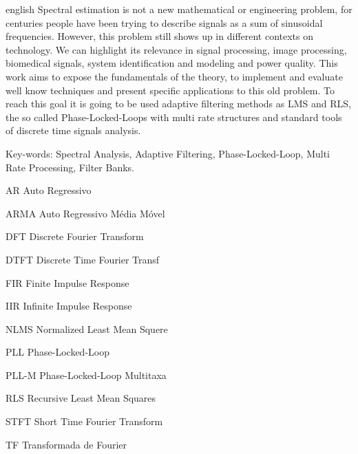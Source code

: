 \documentclass[
12pt,
openany, %
oneside, %
a4paper,			
english,			
brazil			        %
]{abntbibufjf}
\begin{document}
\begin{resumo}[ABSTRACT]
	\begin{otherlanguage*}{english}
		Spectral estimation is not a new mathematical or engineering problem, for centuries people have been trying to describe signals as a sum of sinusoidal frequencies.  However, this problem still shows up in different contexts on technology. We can highlight its relevance in signal processing, image processing, biomedical signals, system identification and modeling and power quality. This work aims to expose the fundamentals of the theory, to implement and evaluate well know techniques and present specific applications to this old problem. To reach this goal it is going to be used adaptive filtering methods as LMS and RLS, the so called Phase-Locked-Loops with multi rate structures and standard tools of discrete time signals analysis.  
		
		Key-words: Spectral Analysis, Adaptive Filtering, Phase-Locked-Loop, Multi Rate Processing, Filter Banks.
		
	\end{otherlanguage*}
\end{resumo}


\listoffigures*
\cleardoublepage


\listoftables*
\cleardoublepage

\begin{siglas} %
	\item[AR]  Auto Regressivo
	\item[ARMA] Auto Regressivo Média Móvel 
	\item[DFT] Discrete Fourier Transform
	\item[DTFT] Discrete Time Fourier Transf
	\item[FIR] Finite Impulse Response
	\item[IIR] Infinite Impulse Response
	\item[NLMS] Normalized Least Mean Squere
	\item[PLL] Phase-Locked-Loop 
	\item[PLL-M] Phase-Locked-Loop Multitaxa
	\item[RLS] Recursive Least Mean Squares
	\item[STFT] Short Time Fourier Transform
	\item[TF] Transformada de Fourier
\end{siglas}
\end{document}

